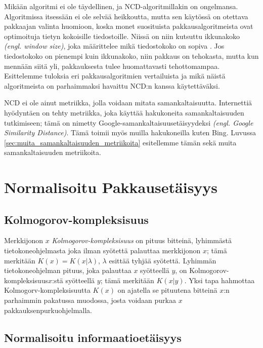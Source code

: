 \documentclass[12pt,finnish]{tktltiki2}
\theoremstyle{definition}
\theoremstyle{remark}
\newcommand{\engl}[1]{\emph{(engl. #1)}}
\newcommand{\kolmogorov}{Kolmogorov-kompleksisuus}
\begin{document}
  Mikään algoritmi ei ole täydellinen, ja NCD-algoritmillakin on ongelmansa.
  Algoritmissa itsessään ei ole selvää heikkoutta, mutta sen käytössä on otettava pakkaajan valinta huomioon, koska monet suosituista pakkausalgoritmeista ovat optimoituja tietyn kokoisille tiedostoille.
  Niissä on niin kutsuttu ikkunakoko \engl{window size}, joka määrittelee mikä tiedostokoko on sopiva \cite{cebrian2005common}.
  Jos tiedostokoko on pienempi kuin ikkunakoko, niin pakkaus on tehokasta, mutta kun mennään siitä yli, pakkauksesta tulee huomattavasti tehottomampaa.
  Esittelemme tuloksia eri pakkausalgoritmien vertailuista ja mikä näistä algoritmeista on parhaimmaksi havaittu NCD:n kanssa käytettäväksi.


\label{par:intro-5}
  NCD ei ole ainut metriikka, jolla voidaan mitata samankaltaisuutta.
  Internettiä hyödyntäen on tehty metriikka, joka käyttää hakukoneita samankaltaisuuden tutkimiseen; tämä on nimetty Google-samankaltaisuusetäisyydeksi \engl{Google Similarity Distance}.
  Tämä toimii myös muilla hakukoneilla kuten Bing. Luvussa \ref{sec:muita_samankaltaisuuden_metriikoita} esitellemme tämän sekä muita samankaltaisuuden metriikoita.


\section{Normalisoitu Pakkausetäisyys} %
\label{sec:normalisoitu_pakkauset_isyys}
  \subsection{\kolmogorov} %
\label{sub:kolmogorov_kompleksisuus}

  Merkkijonon $x$ \emph{\kolmogorov} on pituus bitteinä, lyhimmästä tietokoneohjelmasta joka ilman syötettä palauttaa merkkijonon $x$; tämä merkitään $K(x)=K(x|\lambda)$, $\lambda$ esittää tyhjää syötettä.
  Lyhimmän tietokoneohjelman pituus, joka palauttaa $x$ syötteellä $y$, on \kolmogorov $x$:stä syötteellä $y$; tämä merkitään $K(x|y)$.
  Yksi tapa hahmottaa Kolmogorv-kompleksisuutta $K(x)$ on ajatella se pituutena bitteinä $x$:n parhaimmin pakatussa muodossa, josta voidaan purkaa $x$ pakkauksenpurkuohjelmalla.

\subsection{Normalisoitu informaatioetäisyys} %
\label{sub:normalisoitu_informaatioet_isyys}
\end{document}

